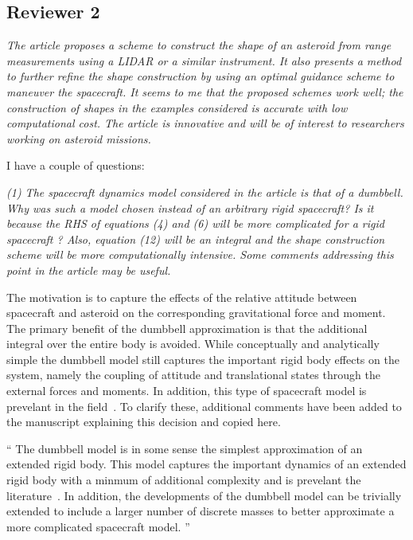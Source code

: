 \documentclass[11pt]{article}
\newenvironment{correction}{\begin{list}{}{\setlength{\leftmargin}{1cm}\setlength{\rightmargin}{1cm}}\vspace{\parsep}\item[]``}{''\end{list}}
\newcommand{\comment}[1]{\item \itshape #1 \normalfont}
\begin{document}
\subsection*{Reviewer 2}
\begin{itemize}\setlength{\itemsep}{2\parsep}

    
    \comment{The article proposes a scheme to construct the shape of an asteroid from range measurements using a LIDAR or a similar instrument. 
        It also presents a method to further refine the shape construction by using an optimal guidance scheme to maneuver the spacecraft. 
        It seems to me that the proposed schemes work well; the construction of shapes in the examples considered is accurate with low computational cost. 
        The article is innovative and will be of interest to researchers working on asteroid missions.   

        I have a couple of questions:
    }


\comment{(1) The spacecraft dynamics model considered in the article is that of a dumbbell. 
Why was such a model chosen instead of an arbitrary rigid spacecraft?
Is it because the RHS of equations (4) and (6) will be more complicated for a rigid spacecraft ?
Also, equation (12) will be an integral and the shape construction scheme will be more computationally intensive.
Some comments addressing this point in the article may be useful.}

The motivation is to capture the effects of the relative attitude between spacecraft and asteroid on the corresponding gravitational force and moment. 
The primary benefit of the dumbbell approximation is that the additional integral over the entire body is avoided. 
While conceptually and analytically simple the dumbbell model still captures the important rigid body effects on the system, namely the coupling of attitude and translational states through the external forces and moments.
In addition, this type of spacecraft model is prevelant in the field~\cite{kulumani2017b,lee2006a,lee2007a,elmasri2005}.
To clarify these, additional comments have been added to the manuscript explaining this decision and copied here.


\begin{correction}
The dumbbell model is in some sense the simplest approximation of an extended rigid body.
This model captures the important dynamics of an extended rigid body with a minmum of additional complexity and is prevelant the literature~\cite{kulumani2017b,lee2006a,lee2007a,elmasri2005}.
In addition, the developments of the dumbbell model can be trivially extended to include a larger number of discrete masses to better approximate a more complicated spacecraft model.
\end{correction}


\end{itemize}
\end{document}
